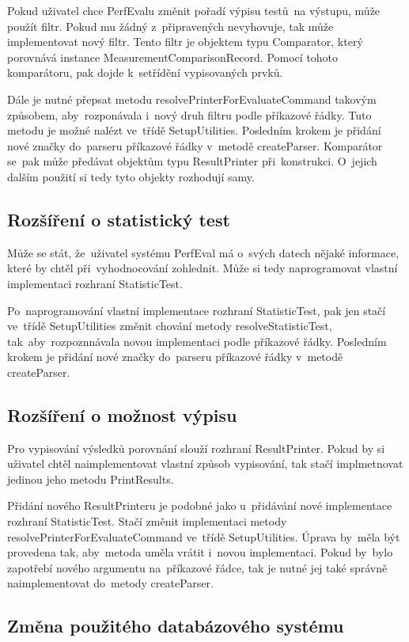 Pokud uživatel chce  PerfEvalu změnit pořadí výpisu testů~na výstupu, může použít filtr.
Pokud mu žádný z~připravených nevyhovuje, tak může implementovat nový filtr.
Tento filtr je objektem typu Comparator, který porovnává instance MeasurementComparisonRecord. Pomocí tohoto
komparátoru, pak dojde k~setřídění vypisovaných prvků.

Dále je nutné přepsat metodu resolvePrinterForEvaluateCommand takovým způsobem, aby~rozponávala i~nový druh filtru
podle příkazové řádky. Tuto metodu je možné nalézt ve~třídě SetupUtilities.
Posledním krokem je přidání nové značky do~parseru příkazové řádky v~metodě createParser.
Komparátor se~pak může předávat objektům typu ResultPrinter při~konstrukci.
O~jejich dalším použití si tedy tyto objekty rozhodují samy.

\subsection{Rozšíření o statistický test}

Může se stát, že~uživatel systému PerfEval má o~svých datech nějaké informace, které
by chtěl při~vyhodnocování zohlednit. Může si tedy naprogramovat vlastní implementaci
rozhraní StatisticTest.

Po~naprogramování vlastní implementace rozhraní StatisticTest, pak jen stačí ve~třídě SetupUtilities
změnit chování metody resolveStatisticTest, tak~aby~rozpoznnávala novou implementaci podle příkazové řádky. Posledním krokem je
přidání nové značky do~parseru příkazové řádky v~metodě createParser.

\subsection{Rozšíření o možnost výpisu}

Pro vypisování výsledků porovnání slouží rozhraní ResultPrinter. Pokud by si uživatel chtěl naimplementovat
vlastní způsob vypisování, tak stačí implmetnovat jedinou jeho metodu PrintResults.

Přidání nového ResultPrinteru je podobné jako u~přidávání nové implementace rozhraní StatisticTest.
Stačí změnit implementaci metody resolvePrinterForEvaluateCommand ve~třídě SetupUtilities.
Úprava by~měla být provedena tak, aby~metoda uměla vrátit i~novou implementaci.
Pokud by~bylo zapotřebí nového argumentu na~příkazové řádce, tak je nutné jej také
správně naimplementovat do~metody createParser.

\subsection{Změna použitého databázového systému}

